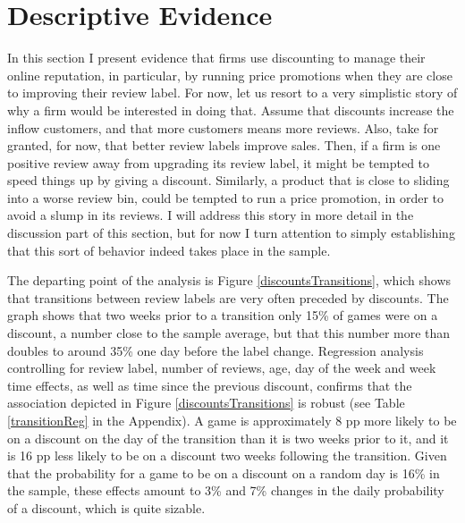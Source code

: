 \documentclass[
  12pt,
  pagebackref]{article}
\begin{document}
\hypertarget{descriptive-evidence}{%
\section{Descriptive Evidence}\label{descriptive-evidence}}

In this section I present evidence that firms use discounting to manage
their online reputation, in particular, by running price promotions when
they are close to improving their review label. For now, let us resort
to a very simplistic story of why a firm would be interested in doing
that. Assume that discounts increase the inflow customers, and that more
customers means more reviews. Also, take for granted, for now, that
better review labels improve sales. Then, if a firm is one positive
review away from upgrading its review label, it might be tempted to
speed things up by giving a discount. Similarly, a product that is close
to sliding into a worse review bin, could be tempted to run a price
promotion, in order to avoid a slump in its reviews. I will address this
story in more detail in the discussion part of this section, but for now
I turn attention to simply establishing that this sort of behavior
indeed takes place in the sample.

The departing point of the analysis is Figure
\ref{discountsTransitions}, which shows that transitions between review
labels are very often preceded by discounts. The graph shows that two
weeks prior to a transition only 15\% of games were on a discount, a
number close to the sample average, but that this number more than
doubles to around 35\% one day before the label change. Regression
analysis controlling for review label, number of reviews, age, day of
the week and week time effects, as well as time since the previous
discount, confirms that the association depicted in Figure
\ref{discountsTransitions} is robust (see Table \ref{transitionReg} in
the Appendix). A game is approximately 8 pp more likely to be on a
discount on the day of the transition than it is two weeks prior to it,
and it is 16 pp less likely to be on a discount two weeks following the
transition. Given that the probability for a game to be on a discount on
a random day is 16\% in the sample, these effects amount to 3\% and 7\%
changes in the daily probability of a discount, which is quite sizable.
\end{document}
